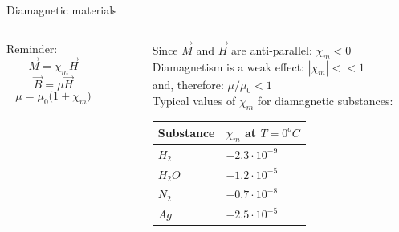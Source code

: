 \begin{frame}{Diamagnetic materials}
\begin{columns}
  \begin{column}{0.25\textwidth}
   \begin{block}{}
     Reminder:
     \begin{equation*}
       \vec{M} = \chi_{m} \vec{H}
     \end{equation*}
     \begin{equation*}
       \vec{B} = \mu \vec{H}
     \end{equation*}
     \begin{equation*}
        \mu = \mu_0 \Big(1 + \chi_{m} \Big)
     \end{equation*}
   \end{block}
  \end{column}
  \begin{column}{0.05\textwidth}
  \end{column}
  \begin{column}{0.70\textwidth}
     Since $\vec{M}$ and $\vec{H}$ are anti-parallel: $\chi_{m} < 0$\\
     \vspace{0.2cm}
     Diamagnetism is a weak effect: $|\chi_{m}| << 1$\\
     and, therefore: $\mu / \mu_{0} < 1$\\
     \vspace{0.2cm}
     Typical values of $\chi_m$ for diamagnetic substances:
     \begin{center}
       \begin{table}[H]
         \begin{tabular}{|l|l|}
         \hline
           Substance &  $\chi_m$ at $T=0^{o}C$ \\
         \hline
           $H_{2}$  & $-2.3 \cdot 10^{-9}$ \\
           $H_{2}O$ & $-1.2 \cdot 10^{-5}$ \\
           $N_{2}$  & $-0.7 \cdot 10^{-8}$ \\
           $Ag$     & $-2.5 \cdot 10^{-5}$ \\
         \hline
         \end{tabular}
       \end{table}
     \end{center}
  \end{column}
\end{columns}

\end{frame}

%
%
%

